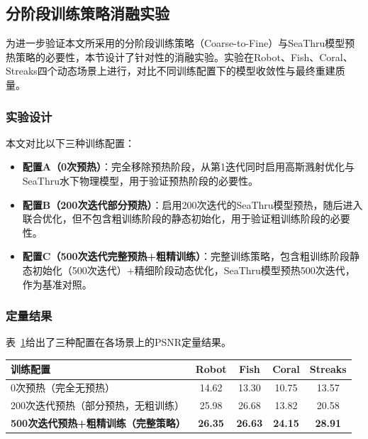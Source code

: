 
\subsection{分阶段训练策略消融实验}

为进一步验证本文所采用的分阶段训练策略（Coarse-to-Fine）与SeaThru模型预热策略的必要性，本节设计了针对性的消融实验。实验在Robot、Fish、Coral、Streaks四个动态场景上进行，对比不同训练配置下的模型收敛性与最终重建质量。

\subsubsection{实验设计}

本文对比以下三种训练配置：

\begin{itemize}
  \item \textbf{配置A（0次预热）}：完全移除预热阶段，从第1迭代同时启用高斯溅射优化与SeaThru水下物理模型，用于验证预热阶段的必要性。
  \item \textbf{配置B（200次迭代部分预热）}：启用200次迭代的SeaThru模型预热，随后进入联合优化，但不包含粗训练阶段的静态初始化，用于验证粗训练阶段的必要性。
  \item \textbf{配置C（500次迭代完整预热+粗精训练）}：完整训练策略，包含粗训练阶段静态初始化（500次迭代）+精细阶段动态优化，SeaThru模型预热500次迭代，作为基准对照。
\end{itemize}

\subsubsection{定量结果}

表~\ref{tab:ablation_training_psnr}给出了三种配置在各场景上的PSNR定量结果。

\begin{table}[htbp]
  \centering
  \label{tab:ablation_training_psnr}
  \begin{tabular}{lcccc}
    \hline
    \textbf{训练配置} & \textbf{Robot} & \textbf{Fish} & \textbf{Coral} & \textbf{Streaks} \\
    \hline
    0次预热（完全无预热） & 14.62 & 13.30 & 10.75 & 13.57 \\
    200次迭代预热（部分预热，无粗训练） & 25.98 & 26.68 & 13.82 & 20.58 \\
    \textbf{500次迭代预热+粗精训练（完整策略）} & \textbf{26.35} & \textbf{26.63} & \textbf{24.15} & \textbf{28.91} \\
    \hline
  \end{tabular}
\end{table}

